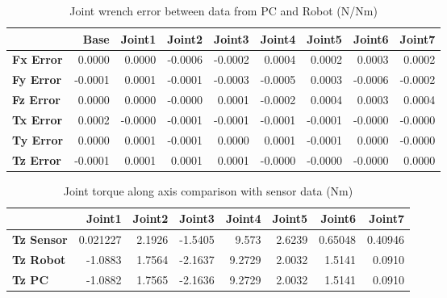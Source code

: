 \begin{table}[h!]
	\centering
	\caption{Joint wrench error between data from PC and Robot (N/Nm)}
	\label{wrech_Error_Pose5}
	\begin{tabular}{|l|r|r|r|r|r|r|r|r|}
		\hline
		\textbf{}  & \textbf{Base} & \textbf{Joint1}  & \textbf{Joint2}  & \textbf{Joint3}  & \textbf{Joint4}  & \textbf{Joint5}  & \textbf{Joint6}  & \textbf{Joint7} \\ \hline
		\textbf{Fx Error}  & 0.0000        & 0.0000        & -0.0006        & -0.0002        & 0.0004        & 0.0002        & 0.0003        & 0.0002 \\ \hline
		\textbf{Fy Error}  & -0.0001        & 0.0001        & -0.0001        & -0.0003        & -0.0005        & 0.0003        & -0.0006        & -0.0002 \\ \hline
		\textbf{Fz Error}  & 0.0000        & 0.0000        & -0.0000        & 0.0001        & -0.0002        & 0.0004        & 0.0003        & 0.0004 \\ \hline
		\textbf{Tx Error}  & 0.0002        & -0.0000        & -0.0001        & -0.0001        & -0.0001        & -0.0001        & -0.0000        & -0.0000 \\ \hline
		\textbf{Ty Error}  & 0.0000        & 0.0001        & -0.0001        & 0.0000        & 0.0001        & -0.0001        & 0.0000        & -0.0000 \\ \hline
		\textbf{Tz Error}  & -0.0001        & 0.0001        & 0.0001        & 0.0001        & -0.0000        & -0.0000        & -0.0000        & 0.0000 \\ \hline
	\end{tabular}
\end{table}

\begin{table}[h!]
	\centering
	\caption{Joint torque along axis comparison with sensor data (Nm)}
	\label{wrech_Sensor_Pose5}
	\begin{tabular}{|l|r|r|r|r|r|r|r|}
		\hline
		\textbf{} & \textbf{Joint1} & \textbf{Joint2} & \textbf{Joint3} & \textbf{Joint4} & \textbf{Joint5} & \textbf{Joint6} & \textbf{Joint7} \\ \hline
		\textbf{Tz Sensor}  & 0.021227           & 2.1926           & -1.5405            & 9.573           & 2.6239           & 0.65048           & 0.40946           \\ \hline
		\textbf{Tz Robot}  	& -1.0883           & 1.7564           & -2.1637            & 9.2729           & 2.0032           & 1.5141           & 0.0910           \\ \hline
		\textbf{Tz PC}  	& -1.0882           & 1.7565           & -2.1636            & 9.2729           & 2.0032           & 1.5141           & 0.0910           \\ \hline
	\end{tabular}
\end{table}

